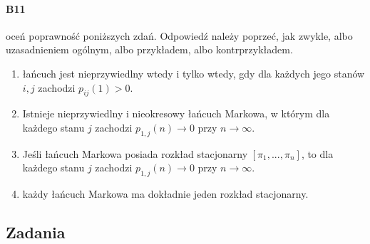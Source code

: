\paragraph{B11} oceń poprawność poniższych zdań. Odpowiedź należy poprzeć, jak zwykle, albo uzasadnieniem ogólnym, albo przykładem, albo kontrprzykładem.
\begin{enumerate}[label=\alph*)]
\item łańcuch jest nieprzywiedlny wtedy i tylko wtedy, gdy dla każdych jego stanów $i, j$ zachodzi $p_{ij}(1) > 0$.
\item Istnieje nieprzywiedlny i nieokresowy łańcuch Markowa, w którym dla każdego stanu $j$ zachodzi $p_{1,j} (n) \rightarrow 0$ przy $n \to \infty$.
\item Jeśli łańcuch Markowa posiada rozkład stacjonarny $[\pi_1, . . . , \pi_n]$, to dla każdego stanu $j$ zachodzi $p_{1,j} (n) \rightarrow 0$ przy $n \to \infty$.
\item każdy łańcuch Markowa ma dokładnie jeden rozkład stacjonarny.
\end{enumerate}

\subsection{Zadania}

